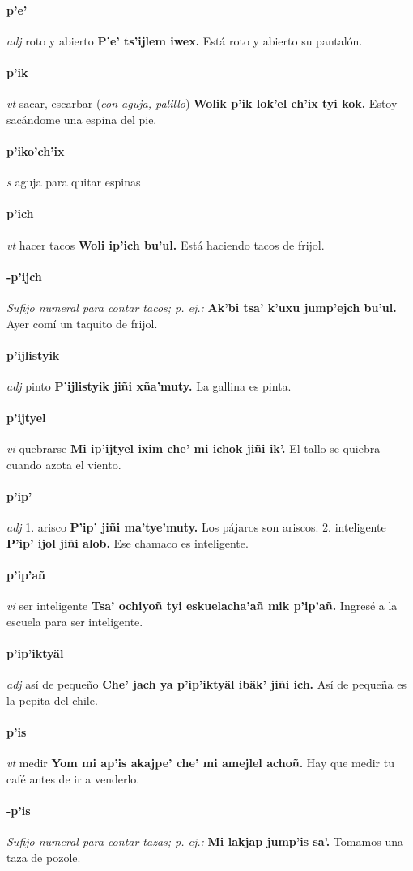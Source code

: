 \documentclass{scrbook}
\newcommand{\entry}[1]{\paragraph{#1}}
\newcommand{\onedefinition}[1]{#1.}
\newcommand{\nontranslationdef}[1]{\textit{#1}}
\newcommand{\partofspeech}[1]{\textit{#1}}
\newcommand{\spanishtranslation}[1]{#1}
\newcommand{\clarification}[1]{(\textit{#1})}
\newcommand{\cholexample}[1]{\textbf{#1}}
\newcommand{\exampletranslation}[1]{#1}
\begin{document}
\begin{multicols}{2}
\entry{p'e'}
\partofspeech{adj}
\spanishtranslation{roto y abierto}
\cholexample{P'e' ts'ijlem iwex.}
\exampletranslation{Está roto y abierto su pantalón.}

\entry{p'ik}
\partofspeech{vt}
\spanishtranslation{sacar, escarbar}
\clarification{con aguja, palillo}
\cholexample{Wolik p'ik lok'el ch'ix tyi kok.}
\exampletranslation{Estoy sacándome una espina del pie.}

\entry{p'iko'ch'ix}
\partofspeech{s}
\spanishtranslation{aguja para quitar espinas}

\entry{p'ich}
\partofspeech{vt}
\spanishtranslation{hacer tacos}
\cholexample{Woli ip'ich bu'ul.}
\exampletranslation{Está haciendo tacos de frijol.}

\entry{-p'ijch}
\nontranslationdef{Sufijo numeral para contar tacos; p. ej.:}
\cholexample{Ak'bi tsa' k'uxu jump'ejch bu'ul.}
\exampletranslation{Ayer comí un taquito de frijol.}

\entry{p'ijlistyik}
\partofspeech{adj}
\spanishtranslation{pinto}
\cholexample{P'ijlistyik jiñi xña'muty.}
\exampletranslation{La gallina es pinta.}

\entry{p'ijtyel}
\partofspeech{vi}
\spanishtranslation{quebrarse}
\cholexample{Mi ip'ijtyel ixim che' mi ichok jiñi ik'.}
\exampletranslation{El tallo se quiebra cuando azota el viento.}

\entry{p'ip'}
\partofspeech{adj}
\onedefinition{1}
\spanishtranslation{arisco}
\cholexample{P'ip' jiñi ma'tye'muty.}
\exampletranslation{Los pájaros son ariscos.}
\onedefinition{2}
\spanishtranslation{inteligente}
\cholexample{P'ip' ijol jiñi alob.}
\exampletranslation{Ese chamaco es inteligente.}

\entry{p'ip'añ}
\partofspeech{vi}
\spanishtranslation{ser inteligente}
\cholexample{Tsa' ochiyoñ tyi eskuelacha'añ mik p'ip'añ.}
\exampletranslation{Ingresé a la escuela para ser inteligente.}

\entry{p'ip'iktyäl}
\partofspeech{adj}
\spanishtranslation{así de pequeño}
\cholexample{Che' jach ya p'ip'iktyäl ibäk' jiñi ich.}
\exampletranslation{Así de pequeña es la pepita del chile.}

\entry{p'is}
\partofspeech{vt}
\spanishtranslation{medir}
\cholexample{Yom mi ap'is akajpe' che' mi amejlel achoñ.}
\exampletranslation{Hay que medir tu café antes de ir a venderlo.}

\entry{-p'is}
\nontranslationdef{Sufijo numeral para contar tazas; p. ej.:}
\cholexample{Mi lakjap jump'is sa'.}
\exampletranslation{Tomamos una taza de pozole.}


\end{multicols}
\end{document}
